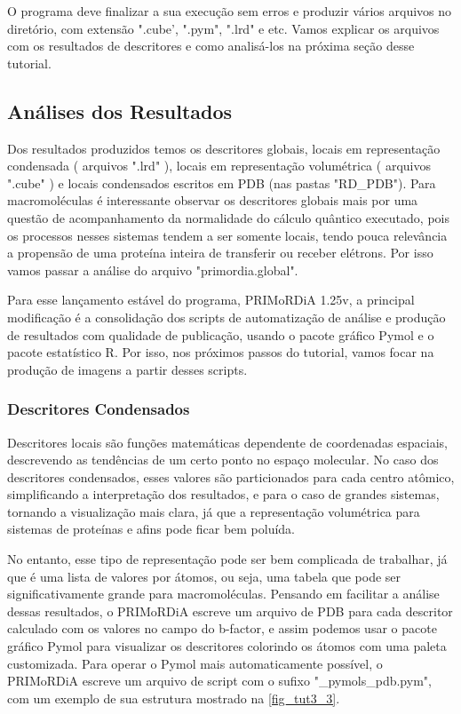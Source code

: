 \documentclass[a4paper,11pt]{refart}
\begin{document}
O programa deve finalizar a sua execução sem erros e produzir vários arquivos no diretório, com extensão ".cube', ".pym", ".lrd" e etc. Vamos explicar os arquivos com os resultados de descritores e como analisá-los na próxima seção desse tutorial.

\subsection{Análises dos Resultados}

Dos resultados produzidos temos os descritores globais, locais em representação condensada ( arquivos ".lrd" ), locais em representação volumétrica ( arquivos ".cube" ) e locais condensados escritos em PDB (nas pastas "RD\_PDB"). Para macromoléculas é interessante observar os descritores globais mais por uma questão de acompanhamento da normalidade do cálculo quântico executado, pois os processos nesses sistemas tendem a ser somente locais, tendo pouca relevância a propensão de uma proteína inteira de transferir ou receber elétrons. Por isso vamos passar a análise do arquivo "primordia.global".

Para esse lançamento estável do programa, PRIMoRDiA 1.25v, a principal modificação é a consolidação dos scripts de automatização de análise e produção de resultados com qualidade de publicação, usando o pacote gráfico Pymol e o pacote estatístico R. Por isso, nos próximos passos do tutorial, vamos focar na produção de imagens a partir desses scripts.

\subsubsection{Descritores Condensados} 

Descritores locais são funções matemáticas dependente de coordenadas espaciais, descrevendo as tendências de um certo ponto no espaço molecular. No caso dos descritores condensados, esses valores são particionados para cada centro atômico, simplificando a interpretação dos resultados, e para o caso de grandes sistemas, tornando a visualização mais clara, já que a representação volumétrica para sistemas de proteínas e afins pode ficar bem poluída.

No entanto, esse tipo de representação pode ser bem complicada de trabalhar, já que é uma lista de valores por átomos, ou seja, uma tabela que pode ser significativamente grande para macromoléculas. Pensando em facilitar a análise dessas resultados, o PRIMoRDiA escreve um arquivo de PDB para cada descritor calculado com os valores no campo do b-factor, e assim podemos usar o pacote gráfico Pymol para visualizar os descritores colorindo os átomos com uma paleta customizada. Para operar o Pymol mais automaticamente possível, o PRIMoRDiA escreve um arquivo de script com o sufixo "\_pymols\_pdb.pym", com um exemplo de sua estrutura mostrado na \autoref{fig_tut3_3}.
\end{document}
